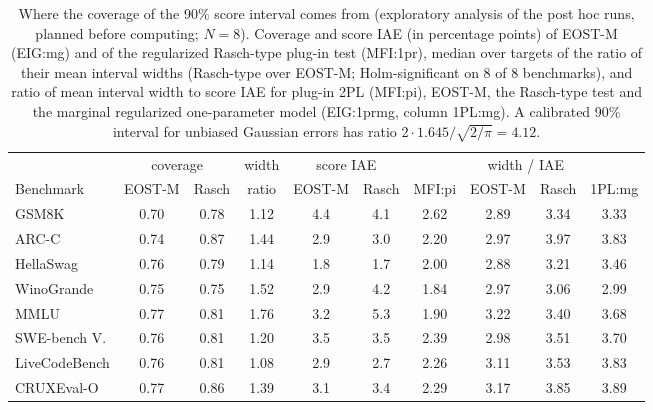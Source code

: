 \begin{table}[tbp]
\centering\footnotesize
\caption{Where the coverage of the 90\% score interval comes from (exploratory analysis of the post hoc runs, planned before computing; $N=8$). Coverage and score IAE (in percentage points) of EOST-M (EIG:mg) and of the regularized Rasch-type plug-in test (MFI:1pr), median over targets of the ratio of their mean interval widths (Rasch-type over EOST-M; Holm-significant on 8 of 8 benchmarks), and ratio of mean interval width to score IAE for plug-in 2PL (MFI:pi), EOST-M, the Rasch-type test and the marginal regularized one-parameter model (EIG:1prmg, column 1PL:mg). A calibrated 90\% interval for unbiased Gaussian errors has ratio $2\cdot1.645/\sqrt{2/\pi}=4.12$.}
\label{tab:covdecomp}
\setlength{\tabcolsep}{3pt}
\begin{tabular}{@{}lccccccccc@{}}
\toprule
 & \multicolumn{2}{c}{coverage} & width & \multicolumn{2}{c}{score IAE} & \multicolumn{4}{c}{width / IAE} \\
\cmidrule(lr){2-3}\cmidrule(lr){4-4}\cmidrule(lr){5-6}\cmidrule(l){7-10}
Benchmark & EOST-M & Rasch & ratio & EOST-M & Rasch & MFI:pi & EOST-M & Rasch & 1PL:mg \\
\midrule
GSM8K & 0.70 & 0.78 & 1.12 & 4.4 & 4.1 & 2.62 & 2.89 & 3.34 & 3.33 \\
ARC-C & 0.74 & 0.87 & 1.44 & 2.9 & 3.0 & 2.20 & 2.97 & 3.97 & 3.83 \\
HellaSwag & 0.76 & 0.79 & 1.14 & 1.8 & 1.7 & 2.00 & 2.88 & 3.21 & 3.46 \\
WinoGrande & 0.75 & 0.75 & 1.52 & 2.9 & 4.2 & 1.84 & 2.97 & 3.06 & 2.99 \\
MMLU & 0.77 & 0.81 & 1.76 & 3.2 & 5.3 & 1.90 & 3.22 & 3.40 & 3.68 \\
SWE-bench V. & 0.76 & 0.81 & 1.20 & 3.5 & 3.5 & 2.39 & 2.98 & 3.51 & 3.70 \\
LiveCodeBench & 0.76 & 0.81 & 1.08 & 2.9 & 2.7 & 2.26 & 3.11 & 3.53 & 3.83 \\
CRUXEval-O & 0.77 & 0.86 & 1.39 & 3.1 & 3.4 & 2.29 & 3.17 & 3.85 & 3.89 \\
\bottomrule
\end{tabular}
\end{table}
